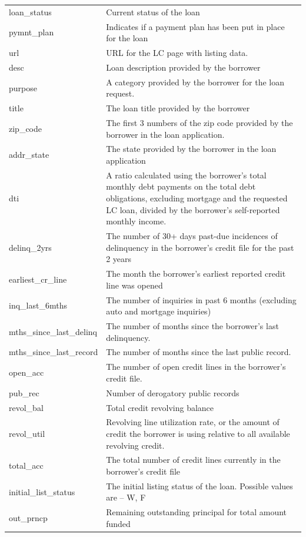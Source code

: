 \documentclass[11pt,]{report}
\begin{document}
\begin{longtable}[t]{>{\raggedright\arraybackslash}p{7cm}>{\raggedright\arraybackslash}p{7cm}}
loan\_status & Current status of the loan\\
\addlinespace
pymnt\_plan & Indicates if a payment plan has been put in place for the loan\\
url & URL for the LC page with listing data.\\
desc & Loan description provided by the borrower\\
purpose & A category provided by the borrower for the loan request.\\
title & The loan title provided by the borrower\\
\addlinespace
zip\_code & The first 3 numbers of the zip code provided by the borrower in the loan application.\\
addr\_state & The state provided by the borrower in the loan application\\
dti & A ratio calculated using the borrower’s total monthly debt payments on the total debt obligations, excluding mortgage and the requested LC loan, divided by the borrower’s self-reported monthly income.\\
delinq\_2yrs & The number of 30+ days past-due incidences of delinquency in the borrower's credit file for the past 2 years\\
earliest\_cr\_line & The month the borrower's earliest reported credit line was opened\\
\addlinespace
inq\_last\_6mths & The number of inquiries in past 6 months (excluding auto and mortgage inquiries)\\
mths\_since\_last\_delinq & The number of months since the borrower's last delinquency.\\
mths\_since\_last\_record & The number of months since the last public record.\\
open\_acc & The number of open credit lines in the borrower's credit file.\\
pub\_rec & Number of derogatory public records\\
\addlinespace
revol\_bal & Total credit revolving balance\\
revol\_util & Revolving line utilization rate, or the amount of credit the borrower is using relative to all available revolving credit.\\
total\_acc & The total number of credit lines currently in the borrower's credit file\\
initial\_list\_status & The initial listing status of the loan. Possible values are – W, F\\
out\_prncp & Remaining outstanding principal for total amount funded\\

\end{longtable}
\end{document}
